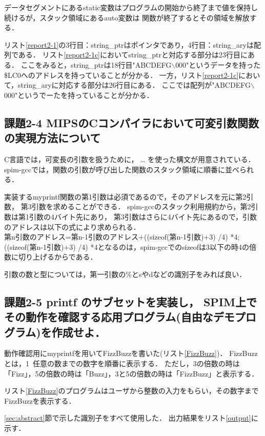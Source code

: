 \documentclass[11pt]{jarticle}
\begin{document}
データセグメントにあるstatic変数はプログラムの開始から終了まで値を保持し続けるが，スタック領域にあるauto変数は
関数が終了するとその領域を解放する．

リスト\ref{report2-1}の3行目：string\_ptrはポインタであり，4行目：string\_aryは配列である．
リスト\ref{report2-1c}においてstring\_ptrと対応する部分は23行目にある．
ここをみると，string\_ptrは18行目"ABCDEFG$\backslash$000"というデータを持った\$LC0へのアドレスを持っていることが分かる．
一方，リスト\ref{report2-1c}において，string\_aryに対応する部分は26行目にある．
ここでは配列が"ABCDEFG$\backslash$000"というでーたを持っていることが分かる．

\subsection{課題2-4 MIPSのCコンパイラにおいて可変引数関数の実現方法について}

C言語では，可変長の引数を扱うために， … を使った構文が用意されている．
spim-gccでは，関数の引数が呼び出した関数のスタック領域に順番に並べられる．

実装するmyprintf関数の第1引数は必須であるので，そのアドレスを元に第2引数，
第3引数を求めることができる．
spim-gccのスタック利用規約から，第2引数は第1引数の4バイト先にあり，
第3引数はさらに4バイト先にあるので，引数のアドレスは以下の式により求められる．
\\
第n引数のアドレス=第n-1引数のアドレス+((sizeof(第n-1引数)+3) /4) *4;
\\
((sizeof(第n-1引数)+3) /4) *4となるのは，spim-gccでのsizeofは3以下の時4の倍数に切り上げるからである．

引数の数と型については，第一引数の\%とsやdなどの識別子をみれば良い．

\subsection{課題2-5 printf のサブセットを実装し， SPIM上でその動作を確認する応用プログラム(自由なデモプログラム)を作成せよ．}

動作確認用にmyprintfを用いてFizzBuzzを書いた(リスト\ref{FizzBuzz})．
FizzBuzzとは，1~任意の数までの数字を順番に表示する．
ただし，3の倍数の時は「Fizz」，5の倍数の時は「Buzz」，3と5の倍数の時は「FizzBuzz」と表示する．

リスト\ref{FizzBuzz}のプログラムはユーザから整数の入力をもらい，その数字まで
FizzBuzzを表示する．

\ref{sec:abstract}節で示した識別子をすべて使用した．
出力結果をリスト\ref{output}に示す．
\end{document}
